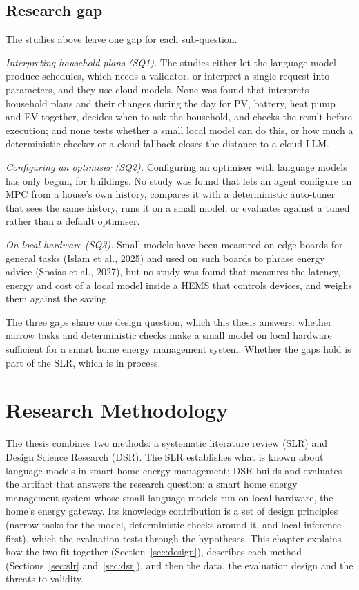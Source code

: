 \documentclass[12pt,a4paper]{report}
\begin{document}
\section{Research gap}

The studies above leave one gap for each sub-question.

\textit{Interpreting household plans (SQ1).} The studies either let the
language model produce schedules, which needs a validator, or interpret
a single request into parameters, and they use cloud models. None was
found that interprets household plans and their changes during the day
for PV, battery, heat pump and EV together, decides when to ask the
household, and checks the result before execution; and none tests
whether a small local model can do this, or how much a deterministic
checker or a cloud fallback closes the distance to a cloud LLM.

\textit{Configuring an optimiser (SQ2).} Configuring an optimiser with
language models has only begun, for buildings. No study was found that
lets an agent configure an MPC from a house's own history, compares it
with a deterministic auto-tuner that sees the same history, runs it on
a small model, or evaluates against a tuned rather than a default
optimiser.

\textit{On local hardware (SQ3).} Small models have been measured on
edge boards for general tasks (Islam et al., 2025) and used on such
boards to phrase energy advice (Spaias et al., 2027), but no study was
found that measures the latency, energy and cost of a local model inside
a HEMS that controls devices, and weighs them against the saving.

The three gaps share one design question, which this thesis answers:
whether narrow tasks and deterministic checks make a small model on
local hardware sufficient for a smart home energy management system.
Whether the gaps hold is part of the SLR, which is in process.

\chapter{Research Methodology}
\label{ch:method}

The thesis combines two methods: a systematic literature review (SLR)
and Design Science Research (DSR). The SLR establishes what is known
about language models in smart home energy management; DSR builds and
evaluates the artifact that answers the research question: a smart home
energy management system whose small language models run on local
hardware, the home's energy gateway. Its knowledge contribution is a
set of design principles (narrow tasks for the model, deterministic
checks around it, and local inference first), which the evaluation
tests through the hypotheses. This chapter
explains how the two fit together (Section~\ref{sec:design}), describes
each method (Sections~\ref{sec:slr} and~\ref{sec:dsr}), and then the
data, the evaluation design and the threats to validity.
\end{document}
